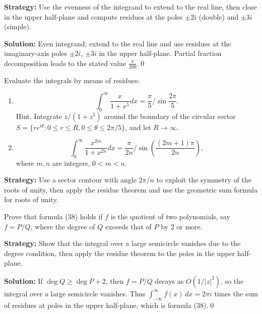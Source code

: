 \noindent\textbf{Strategy:} Use the evenness of the integrand to extend to the real line, then close in the upper half-plane and compute residues at the poles \( \pm 2i \) (double) and \( \pm 3i \) (simple).

\bigskip\noindent\textbf{Solution:}
Even integrand; extend to the real line and use residues at the imaginary-axis poles $\pm2i$, $\pm3i$ in the upper half-plane. Partial fraction decomposition leads to the stated value $\frac{\pi}{200}$.\qed


\begin{problembox}
\begin{problemstatement}
Evaluate the integrals by means of residues:
\begin{enumerate}[label=(\alph*)]
\item \[ \int_0^{\infty} \frac{x}{1 + x^5} dx = \frac{\pi}{5} / \sin \frac{2\pi}{5}. \]
Hint. Integrate \( z / (1 + z^5) \) around the boundary of the circular sector \( S = \{ r e^{i\theta} : 0 \leq r \leq R, 0 \leq \theta \leq 2\pi / 5 \} \), and let \( R \to \infty \).
\item \[ \int_0^{\infty} \frac{x^{2m}}{1 + x^{2n}} dx = \frac{\pi}{2n}/ \sin \left( \frac{(2m + 1) \pi}{2n} \right), \]
where \( m, n \) are integers, \( 0 < m < n \).
\end{enumerate}
\end{problemstatement}
\end{problembox}

\noindent\textbf{Strategy:} Use a sector contour with angle \( 2\pi/n \) to exploit the symmetry of the roots of unity, then apply the residue theorem and use the geometric sum formula for roots of unity.


\begin{problembox}
\begin{problemstatement}
Prove that formula (38) holds if \( f \) is the quotient of two polynomials, say \( f = P/Q \), where the degree of \( Q \) exceeds that of \( P \) by 2 or more.
\end{problemstatement}
\end{problembox}

\noindent\textbf{Strategy:} Show that the integral over a large semicircle vanishes due to the degree condition, then apply the residue theorem to the poles in the upper half-plane.

\bigskip\noindent\textbf{Solution:}
If $\deg Q\ge \deg P+2$, then $f=P/Q$ decays as $O(1/|z|^2)$, so the integral over a large semicircle vanishes. Thus $\int_{-\infty}^{\infty} f(x)\,dx=2\pi i$ times the sum of residues at poles in the upper half-plane, which is formula (38).\qed


